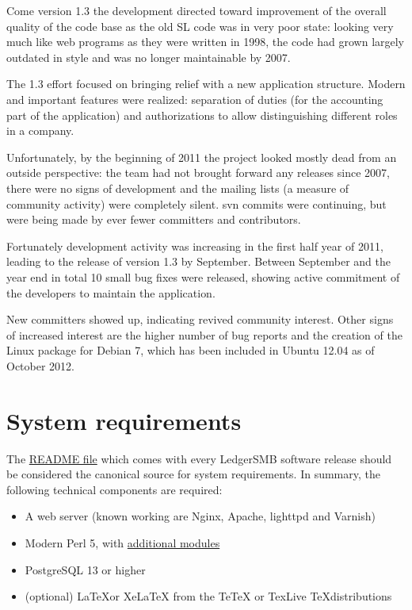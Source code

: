 Come version 1.3 the development directed toward improvement of the overall
quality of the code base as the old \acrshort{SL} code was in very poor state:
looking very much like web programs as they were written in 1998, the code had
grown largely outdated in style and was no longer maintainable by 2007.

The 1.3 effort focused on bringing relief with a new application structure.
Modern and important features were realized: separation of duties (for the
accounting part of the application) and authorizations to allow distinguishing
different roles in a company.

Unfortunately, by the beginning of 2011 the project looked mostly dead from
an outside perspective: the team had not brought forward any releases since
2007, there were no signs of development and the mailing lists (a measure
of community activity) were
completely silent.  \gls{svn} commits were continuing, but were being made by
ever fewer committers and contributors.

Fortunately development activity was increasing in the first half year of 2011,
leading to the release of version 1.3 by September.  Between September and the
year end in total 10 small bug fixes were released, showing active commitment
of the developers to maintain the application.

New committers showed up, indicating revived community interest. Other signs of
increased interest are the higher number of bug reports and the creation of the
Linux package for Debian 7, which has been included in Ubuntu 12.04 as of
October 2012.



\section{System requirements}
\label{sec-ledgersmb-system-requirements}

The \href{https://github.com/ledgersmb/LedgerSMB/blob/1.10/README.md#system-requirements}{README file}
which comes with every LedgerSMB software release should be
considered the canonical source for system requirements. In summary, the
following technical components are required:

\begin{itemize}
\item A web server (known working are Nginx, Apache, lighttpd and Varnish)
\item Modern Perl 5, with \href{https://github.com/ledgersmb/LedgerSMB/blob/1.10/cpanfile}{additional modules}
\item PostgreSQL 13 or higher
\item (optional) \LaTeX or XeLaTeX from the TeTeX or TexLive \TeX distributions
\end{itemize}

